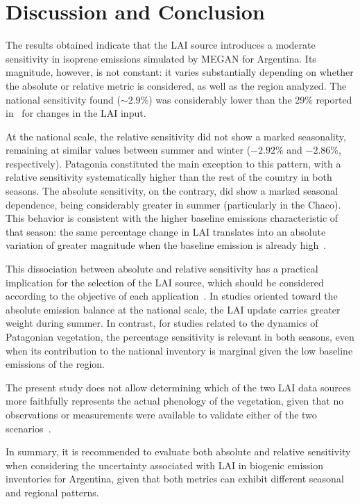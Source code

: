 \documentclass[conference,a4paper]{IEEEtran}   %
\begin{document}
\section{Discussion and Conclusion}

The results obtained indicate that the LAI source introduces a moderate sensitivity in isoprene emissions simulated by MEGAN for Argentina. Its magnitude, however, is not constant: it varies substantially depending on whether the absolute or relative metric is considered, as well as the region analyzed. The national sensitivity found (${\sim}2.9\%$) was considerably lower than the 29\% reported in~\cite{guenther2006} for changes in the LAI input.

At the national scale, the relative sensitivity did not show a marked seasonality, remaining at similar values between summer and winter ($-2.92\%$ and $-2.86\%$, respectively). Patagonia constituted the main exception to this pattern, with a relative sensitivity systematically higher than the rest of the country in both seasons. The absolute sensitivity, on the contrary, did show a marked seasonal dependence, being considerably greater in summer (particularly in the Chaco). This behavior is consistent with the higher baseline emissions characteristic of that season: the same percentage change in LAI translates into an absolute variation of greater magnitude when the baseline emission is already high~\cite{guenther2006,sun2025}.

This dissociation between absolute and relative sensitivity has a practical implication for the selection of the LAI source, which should be considered according to the objective of each application~\cite{lin2023}. In studies oriented toward the absolute emission balance at the national scale, the LAI update carries greater weight during summer. In contrast, for studies related to the dynamics of Patagonian vegetation, the percentage sensitivity is relevant in both seasons, even when its contribution to the national inventory is marginal given the low baseline emissions of the region.

The present study does not allow determining which of the two LAI data sources more faithfully represents the actual phenology of the vegetation, given that no observations or measurements were available to validate either of the two scenarios~\cite{zhang2004,myneni2021}.

In summary, it is recommended to evaluate both absolute and relative sensitivity when considering the uncertainty associated with LAI in biogenic emission inventories for Argentina, given that both metrics can exhibit different seasonal and regional patterns.
\end{document}
